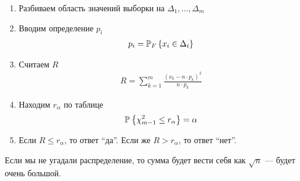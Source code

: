 \begin{enumerate}
    \item Разбиваем область значений выборки на $\Delta_1, \dots, \Delta_m$
    \item Вводим определение $p_i$
        \begin{align*}
            p_i = \Probability[F]{x_i \in \Delta_i}
        \end{align*}
    \item Считаем $R$
        \begin{align*}
            R = \sum_{k=1}^{m}\frac{\left( \nu_k - n \cdot p_k \right)^2}{
                n \cdot p_k}
        \end{align*}
    \item Находим $r_{\alpha}$ по таблице
        \begin{align*}
            \Probability{\chi_{m-1}^2 \le r_{\alpha}} = \alpha
        \end{align*}
    \item Если $R \le r_{\alpha}$, то ответ ``да''. Если же $R > r_{\alpha}$,
        то ответ ``нет''.
\end{enumerate}

Если мы не угадали распределение, то сумма будет вести себя как $\sqrt{n}$ ---
будет очень большой.

